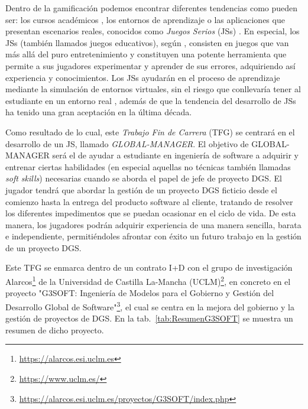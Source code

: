 Dentro de la gamificación podemos encontrar diferentes tendencias como pueden ser: los cursos académicos \cite{murphy2008distance}, los entornos de aprendizaje \cite{burnell2002teaching} o las aplicaciones que presentan escenarios reales, conocidos como \emph{Juegos Serios} (JSs) \cite{meneely2009preparing}. En especial, los JSs (también llamados juegos educativos), según \cite{calderon2018multivocal}, consisten en juegos que van más allá del puro entretenimiento y constituyen una potente herramienta que permite a sus jugadores experimentar y aprender de sus errores, adquiriendo así experiencia y conocimientos. Los JSs ayudarán en el proceso de aprendizaje mediante la simulación de entornos virtuales, sin el riesgo que conllevaría tener al estudiante en un entorno real \cite{lino2015project, beecham2017best, calderon2018multivocal}, además de que la tendencia del desarrollo de JSs ha tenido una gran aceptación en la última década.

Como resultado de lo cual, este \emph{Trabajo Fin de Carrera} (TFG) se centrará en el desarrollo de un JS, llamado \emph{GLOBAL-MANAGER}. El objetivo de GLOBAL-MANAGER será el de ayudar a estudiante en ingeniería de software a adquirir y entrenar ciertas habilidades (en especial aquellas no técnicas también llamadas \emph{soft skills}) necesarias cuando se aborda el papel de jefe de proyecto DGS. El jugador tendrá que abordar la gestión de un proyecto DGS ficticio desde el comienzo hasta la entrega del producto software al cliente, tratando de resolver los diferentes impedimentos que se puedan ocasionar en el ciclo de vida. De esta manera, los jugadores podrán adquirir experiencia de una manera sencilla, barata e independiente, permitiéndoles afrontar con éxito un futuro trabajo en la gestión de un proyecto DGS.

Este TFG se enmarca dentro de un contrato I+D con el grupo de investigación Alarcos\footnote{\url{https://alarcos.esi.uclm.es}} de la Universidad de Castilla La-Mancha (UCLM)\footnote{\url{https://www.uclm.es/}}, en concreto en el proyecto "G3SOFT: Ingeniería de Modelos para el Gobierno y Gestión del Desarrollo Global de Software"\footnote{\url{https://alarcos.esi.uclm.es/proyectos/G3SOFT/index.php}}, el cual se centra en la mejora del gobierno y la gestión de proyectos de DGS. En la tab.~\ref{tab:ResumenG3SOFT} se muestra un resumen de dicho proyecto.

